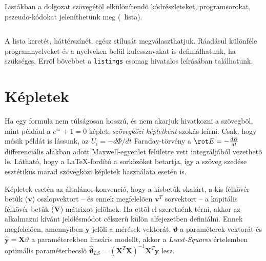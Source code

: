 Listákban a dolgozat szövegétõl elkülönítendõ kódrészleteket, programsorokat, pszeudo-kódokat jeleníthetünk meg (~lista). 
\begin{lstlisting}[frame=single,float=!ht,caption=A fenti számozott felsorolás \LaTeX- forráskódja, label=listing:Example]

\end{lstlisting}
A lista keretét, háttérszínét, egész stílusát megválaszthatjuk. Ráadásul különféle programnyelveket és a nyelveken belül kulcsszavakat is definiálhatunk, ha szükséges. Errõl bõvebbet a \verb+listings+ csomag hivatalos leírásában találhatunk.

\section{Képletek}
Ha egy formula nem túlságosan hosszú, és nem akarjuk hivatkozni a szövegbõl, mint például a $e^{i\pi}+1=0$ képlet, \emph{szövegközi képletként} szokás leírni. Csak, hogy másik példát is lássunk, az $U_i=-d\Phi/dt$ Faraday-törvény a $\rot E=-\frac{dB}{dt}$ differenciális alakban adott Maxwell-egyenlet felületre vett integráljából vezethetõ le. Látható, hogy a \LaTeX-fordító a sorközöket betartja, így a szöveg szedése esztétikus marad szövegközi képletek használata esetén is.

Képletek esetén az általános konvenció, hogy a kisbetûk skalárt, a kis félkövér betûk ($\mathbf{v}$) oszlopvektort -- és ennek megfelelõen $\mathbf{v}^T$ sorvektort -- a kapitális félkövér betûk ($\mathbf{V}$) mátrixot jelölnek. Ha ettõl el szeretnénk térni, akkor az alkalmazni kívánt jelölésmódot célszerû külön alfejezetben definiálni. Ennek megfelelõen, amennyiben $\mathbf{y}$ jelöli a mérések vektorát, $\mathbf{\vartheta}$ a paraméterek vektorát és $\hat{\mathbf{y}}=\mathbf{X}\vartheta$ a paraméterekben lineáris modellt, akkor a \emph{Least-Squares} értelemben optimális paraméterbecslõ $\hat{\mathbf{\vartheta}}_{LS}=(\mathbf{X}^T\mathbf{X})^{-1}\mathbf{X}^T\mathbf{y}$ lesz.

